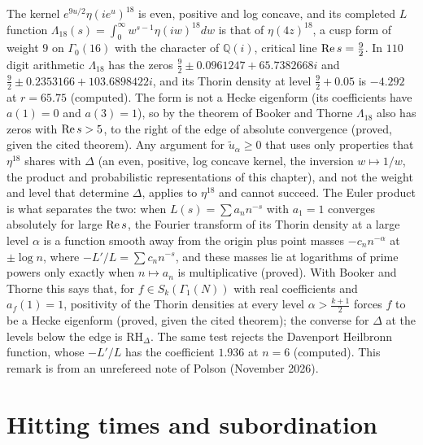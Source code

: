 \begin{remark}\label{dl:rem:eta18}
The kernel $e^{9u/2}\eta(ie^u)^{18}$ is even, positive and log concave, and its completed $L$ function $\Lambda_{18}(s)=\int_0^\infty w^{s-1}\eta(iw)^{18}dw$ is that of $\eta(4z)^{18}$, a cusp form of weight $9$ on $\Gamma_0(16)$ with the character of $\mathbb Q(i)$, critical line $\operatorname{Re} s=\frac92$. In $110$ digit arithmetic $\Lambda_{18}$ has the zeros $\frac92\pm0.0961247+65.7382668i$ and $\frac92\pm0.2353166+103.6898422i$, and its Thorin density at level $\frac92+0.05$ is $-4.292$ at $r=65.75$ (computed). The form is not a Hecke eigenform (its coefficients have $a(1)=0$ and $a(3)=1$), so by the theorem of Booker and Thorne \cite{BookerThorne14} $\Lambda_{18}$ also has zeros with $\operatorname{Re} s>5$, to the right of the edge of absolute convergence (proved, given the cited theorem). Any argument for $\tilde u_\alpha\ge0$ that uses only properties that $\eta^{18}$ shares with $\Delta$ (an even, positive, log concave kernel, the inversion $w\mapsto1/w$, the product and probabilistic representations of this chapter), and not the weight and level that determine $\Delta$, applies to $\eta^{18}$ and cannot succeed. The Euler product is what separates the two: when $L(s)=\sum a_nn^{-s}$ with $a_1=1$ converges absolutely for large $\operatorname{Re} s$, the Fourier transform of its Thorin density at a large level $\alpha$ is a function smooth away from the origin plus point masses $-c_nn^{-\alpha}$ at $\pm\log n$, where $-L'/L=\sum c_nn^{-s}$, and these masses lie at logarithms of prime powers only exactly when $n\mapsto a_n$ is multiplicative (proved). With Booker and Thorne this says that, for $f\in S_k(\Gamma_1(N))$ with real coefficients and $a_f(1)=1$, positivity of the Thorin densities at every level $\alpha>\frac{k+1}2$ forces $f$ to be a Hecke eigenform (proved, given the cited theorem); the converse for $\Delta$ at the levels below the edge is $\mathrm{RH}_\Delta$. The same test rejects the Davenport Heilbronn function, whose $-L'/L$ has the coefficient $1.936$ at $n=6$ (computed). This remark is from an unrefereed note of Polson (November 2026).
\end{remark}

\section{Hitting times and subordination}\label{dl:sec:sub}


